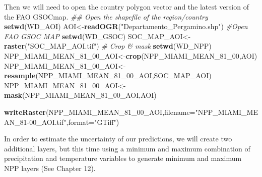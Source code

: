 \documentclass[
  10pt,
  b5paper,
]{book}
\newenvironment{Shaded}{\begin{snugshade}}{\end{snugshade}}
\newcommand{\CommentTok}[1]{\textcolor[rgb]{0.56,0.35,0.01}{\textit{#1}}}
\newcommand{\DataTypeTok}[1]{\textcolor[rgb]{0.13,0.29,0.53}{#1}}
\newcommand{\DecValTok}[1]{\textcolor[rgb]{0.00,0.00,0.81}{#1}}
\newcommand{\KeywordTok}[1]{\textcolor[rgb]{0.13,0.29,0.53}{\textbf{#1}}}
\newcommand{\NormalTok}[1]{#1}
\newcommand{\StringTok}[1]{\textcolor[rgb]{0.31,0.60,0.02}{#1}}
\begin{document}
\begin{Shaded}
\begin{Highlighting}[]
\NormalTok{Then we will need to open the country polygon vector and the latest version of the FAO GSOCmap.}
\CommentTok{## Open the shapefile of the region/country}
\KeywordTok{setwd}\NormalTok{(WD_AOI)}
\NormalTok{AOI<-}\KeywordTok{readOGR}\NormalTok{(}\StringTok{"Departamento_Pergamino.shp"}\NormalTok{)}
\CommentTok{#Open FAO GSOC MAP }
\KeywordTok{setwd}\NormalTok{(WD_GSOC)}
\NormalTok{SOC_MAP_AOI<-}\KeywordTok{raster}\NormalTok{(}\StringTok{"SOC_MAP_AOI.tif"}\NormalTok{)}
\CommentTok{# Crop & mask}
\KeywordTok{setwd}\NormalTok{(WD_NPP)}
\NormalTok{NPP_MIAMI_MEAN_}\DecValTok{81}\NormalTok{_}\DecValTok{00}\NormalTok{_AOI<-}\KeywordTok{crop}\NormalTok{(NPP_MIAMI_MEAN_}\DecValTok{81}\NormalTok{_}\DecValTok{00}\NormalTok{,AOI)}
\NormalTok{NPP_MIAMI_MEAN_}\DecValTok{81}\NormalTok{_}\DecValTok{00}\NormalTok{_AOI<-}\KeywordTok{resample}\NormalTok{(NPP_MIAMI_MEAN_}\DecValTok{81}\NormalTok{_}\DecValTok{00}\NormalTok{_AOI,SOC_MAP_AOI)}
\NormalTok{NPP_MIAMI_MEAN_}\DecValTok{81}\NormalTok{_}\DecValTok{00}\NormalTok{_AOI<-}\KeywordTok{mask}\NormalTok{(NPP_MIAMI_MEAN_}\DecValTok{81}\NormalTok{_}\DecValTok{00}\NormalTok{_AOI,AOI)}

\KeywordTok{writeRaster}\NormalTok{(NPP_MIAMI_MEAN_}\DecValTok{81}\NormalTok{_}\DecValTok{00}\NormalTok{_AOI,}\DataTypeTok{filename=}\StringTok{"NPP_MIAMI_MEAN_81-00_AOI.tif"}\NormalTok{,}\DataTypeTok{format=}\StringTok{"GTiff"}\NormalTok{)}
\end{Highlighting}
\end{Shaded}

In order to estimate the uncertainty of our predictions, we will create two additional layers, but this time using a minimum and maximum combination of precipitation and temperature variables to generate minimum and maximum NPP layers (See Chapter 12).
\end{document}
